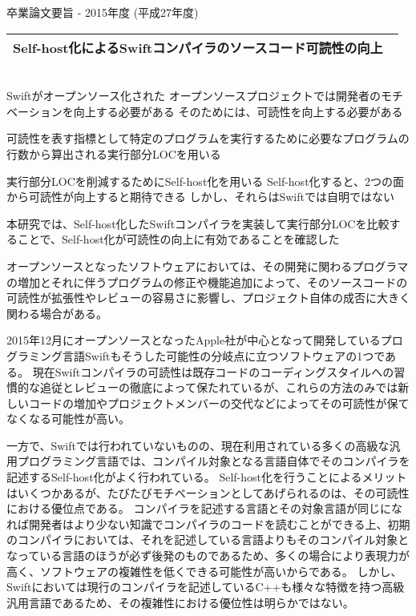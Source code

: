 卒業論文要旨 - 2015年度 (平成27年度)
\begin{center}
\begin{large}
\begin{tabular}{|M{0.97\linewidth}|}
    \hline
    Self-host化によるSwiftコンパイラのソースコード可読性の向上\\
    \hline
\end{tabular}
\end{large}
\end{center}

~ \\

Swiftがオープンソース化された
オープンソースプロジェクトでは開発者のモチベーションを向上する必要がある
そのためには、可読性を向上する必要がある

可読性を表す指標として特定のプログラムを実行するために必要なプログラムの行数から算出される実行部分LOCを用いる

実行部分LOCを削減するためにSelf-host化を用いる
Self-host化すると、2つの面から可読性が向上すると期待できる
しかし、それらはSwiftでは自明ではない

本研究では、Self-host化したSwiftコンパイラを実装して実行部分LOCを比較することで、Self-host化が可読性の向上に有効であることを確認した



オープンソースとなったソフトウェアにおいては、その開発に関わるプログラマの増加とそれに伴うプログラムの修正や機能追加によって、そのソースコードの可読性が拡張性やレビューの容易さに影響し、プロジェクト自体の成否に大きく関わる場合がある。

2015年12月にオープンソースとなったApple社が中心となって開発しているプログラミング言語Swiftもそうした可能性の分岐点に立つソフトウェアの1つである。
現在Swiftコンパイラの可読性は既存コードのコーディングスタイルへの習慣的な追従とレビューの徹底によって保たれているが、これらの方法のみでは新しいコードの増加やプロジェクトメンバーの交代などによってその可読性が保てなくなる可能性が高い。

一方で、Swiftでは行われていないものの、現在利用されている多くの高級な汎用プログラミング言語では、コンパイル対象となる言語自体でそのコンパイラを記述するSelf-host化がよく行われている。
Self-host化を行うことによるメリットはいくつかあるが、たびたびモチベーションとしてあげられるのは、その可読性における優位点である。
コンパイラを記述する言語とその対象言語が同じになれば開発者はより少ない知識でコンパイラのコードを読むことができる上、初期のコンパイラにおいては、それを記述している言語よりもそのコンパイル対象となっている言語のほうが必ず後発のものであるため、多くの場合により表現力が高く、ソフトウェアの複雑性を低くできる可能性が高いからである。
しかし、Swiftにおいては現行のコンパイラを記述しているC++も様々な特徴を持つ高級汎用言語であるため、その複雑性における優位性は明らかではない。


